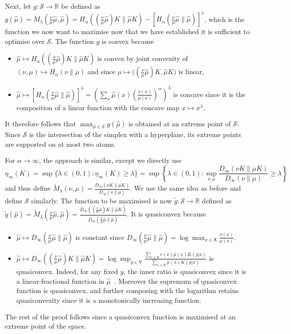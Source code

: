 \documentclass[conference,letterpaper]{IEEEtran}
\def \X{\mathsf X}
\def \Y{\mathsf Y}
\def \calS{\mathcal S}
\def \reals {\mathbb R}
\newcommand{\hellingerInt}[2]{H_{\alpha}\left(#1\|#2\right)}
\begin{document}
    Next, let $g:\calS\to\reals$ be defined as $g(\hat{\mu})=M_\lambda\left(\frac{\nu}{\mu}\hat{\mu},\hat{\mu}\right)= \hellingerInt{(\frac{\nu}{\mu}\hat{\mu}) K}{\hat{\mu} K} - \left[\hellingerInt{\frac{\nu}{\mu}\hat{\mu}}{\hat{\mu}}\right]^\lambda$, which is the function we now want to maximise now that we have established it is sufficient to optimise over $\mathcal{S}$. The function $g$ is convex because 
    \begin{itemize}
        \item $\hat{\mu}\mapsto\hellingerInt{(\frac{\nu}{\mu}\hat{\mu}) K}{\hat{\mu} K}$ is convex by joint convexity of $(\nu,\mu)\mapsto \hellingerInt{\nu}{\mu}$ and since $\hat{\mu}\mapsto \big((\frac{\nu}{\mu}\hat{\mu})K, \hat{\mu}K\big)$ is linear,
        
        \item $\hat{\mu}\mapsto \left[\hellingerInt{\frac{\nu}{\mu}\hat{\mu}}{\hat{\mu}}\right]^\lambda=\left(\sum_x \hat \mu(x) \left(\frac{\nu(x)}{\mu(x)}\right)^{\alpha}\right)^\lambda\nonumber$
        is concave since it is the composition of a linear function with the concave map $x\mapsto x^\lambda$.
    \end{itemize}
    It therefore follows that $\max_{\hat{\mu}\in\calS} g(\hat{\mu})$ is obtained at an extreme point of $\calS$. Since $\calS$ is the intersection of the simplex with a hyperplane, its extreme points are supported on at most two atoms.
    
    For $\alpha\to\infty$, the approach is similar, except we directly use
    \begin{equation*}
        \eta_\infty(K)=\sup\big\{\lambda\in(0,1): \eta_\infty(K)\geq \lambda\big\}=\sup\left\{\lambda\in(0,1): \sup_{\nu, \mu} \frac{D_\infty(\nu K\|\mu K )}{D_\infty(\nu\|\mu)}\geq \lambda\right\}
    \end{equation*}
    and thus define $\widetilde{M}_\lambda(\nu, \mu) = \frac{D_\infty(\nu K\|\mu K )}{D_\infty(\nu\|\mu)}$. We use the same idea as before and define $\mathcal{S}$ similarly. The function to be maximised is now $\tilde{g}:\calS\to\reals$ defined as $\tilde{g}(\hat{\mu})=\widetilde{M}_\lambda\left(\frac{\nu}{\mu}\hat{\mu},\hat{\mu}\right) = \frac{D_\infty((\frac{\nu}{\mu}\hat{\mu}) K\|\hat{\mu} K)}{D_\infty(\frac{\nu}{\mu}\hat{\mu}\|\hat{\mu})}$. It is quasiconvex because
    \begin{itemize}
        \item $\hat{\mu}\mapsto D_\infty(\frac{\nu}{\mu}\hat{\mu}\|\hat{\mu})$ is constant since $D_\infty(\frac{\nu}{\mu}\hat{\mu}\|\hat{\mu})= \log\max_{x\in\X}\frac{\nu(x)}{\mu(x)}$.
        \item $\hat{\mu}\mapsto D_\infty((\frac{\nu}{\mu}\hat{\mu}) K\|\hat{\mu} K) = \log\sup_{y\in\Y}\frac{\sum_{x\in\X}r(x)\hat{\mu}(x)K(y|x)}{\sum_{x\in\X} \hat{\mu}(x)K(y|x)}$ is quasiconvex. Indeed, for any fixed $y$, the inner ratio is quasiconvex since it is a linear-fractional function in $\hat{\mu}$~\cite[Example 3.32]{boyd2004convex}. Moreover the supremum of quasiconvex function is quasiconvex, and further composing with the logarithm retains quasiconvexity since it is a monotonically increasing function.
    \end{itemize}
    The rest of the proof follows since a quasiconvex function is maximised at an extreme point of the space.
\end{document}
